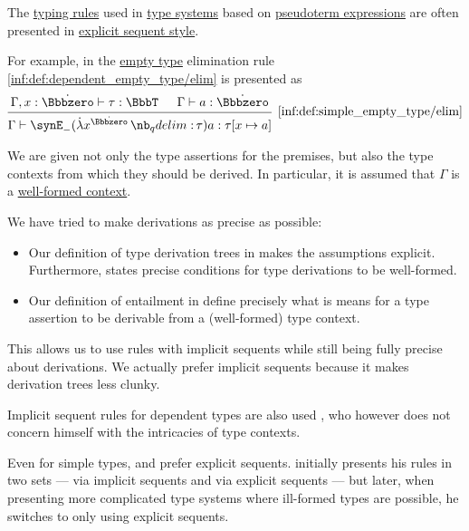 \begin{remark}\label{rem:dependent_type_rule_sequents}
  The \hyperref[con:typing_rule]{typing rules} used in \hyperref[def:abstract_type_system]{type systems} based on \hyperref[con:pseudoterm_expression]{pseudoterm expressions} are often presented in \hyperref[rem:natural_deduction_explicit_sequents]{explicit sequent style}.

  For example, in \cite[\S A.2.7]{UnivalentFoundationsProgram2024OctoberHoTT} the \hyperref[def:dependent_empty_type]{empty type} elimination rule \ref{inf:def:dependent_empty_type/elim} is presented as
  \begin{equation*}
    \begin{prooftree}
      \hypo{ \Gamma, x: \syn\Bbbzero \vdash \tau: \BbbT }
      \hypo{ \Gamma \vdash a: \syn\Bbbzero }
      \infer2[\ref{inf:def:simple_empty_type/elim}]{ \Gamma \vdash \synE_- (\qabs {x^{\syn\Bbbzero}} \tau) a: \tau[x \mapsto a] }
    \end{prooftree}
  \end{equation*}

  We are given not only the type assertions for the premises, but also the type contexts from which they should be derived. In particular, it is assumed that \( \Gamma \) is a \hyperref[rem:well_formed_context]{well-formed context}.

  We have tried to make derivations as precise as possible:
  \begin{itemize}
    \item Our definition of type derivation trees in  makes the assumptions explicit. Furthermore,  states precise conditions for type derivations to be well-formed.

    \item Our definition of entailment in  define precisely what is means for a type assertion to be derivable from a (well-formed) type context.
  \end{itemize}

  This allows us to use rules with implicit sequents while still being fully precise about derivations. We actually prefer implicit sequents because it makes derivation trees less clunky.
\end{remark}
\begin{comments}
  \item Implicit sequent rules for dependent types are also used , who however does not concern himself with the intricacies of type contexts.

  \item Even for simple types,  and  prefer explicit sequents.  initially presents his rules in two sets --- via implicit sequents and via explicit sequents --- but later, when presenting more complicated type systems where ill-formed types are possible, he switches to only using explicit sequents.
\end{comments}

